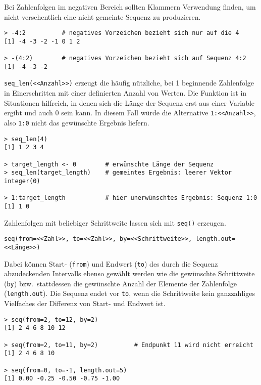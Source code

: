 Bei Zahlenfolgen im negativen Bereich sollten Klammern Verwendung finden, um nicht versehentlich eine nicht gemeinte Sequenz zu produzieren.
\begin{lstlisting}
> -4:2          # negatives Vorzeichen bezieht sich nur auf die 4
[1] -4 -3 -2 -1 0 1 2

> -(4:2)        # negatives Vorzeichen bezieht sich auf Sequenz 4:2
[1] -4 -3 -2
\end{lstlisting}

\lstinline!seq_len(<<Anzahl>>)! erzeugt die häufig nützliche, bei 1 beginnende Zahlenfolge in Einerschritten mit einer definierten Anzahl von Werten. Die Funktion ist in Situationen hilfreich, in denen sich die Länge der Sequenz erst aus einer Variable ergibt und auch 0 sein kann. In diesem Fall würde die Alternative \lstinline!1:<<Anzahl>>!, also \lstinline!1:0! nicht das gewünschte Ergebnis liefern.
\begin{lstlisting}
> seq_len(4)
[1] 1 2 3 4

> target_length <- 0        # erwünschte Länge der Sequenz
> seq_len(target_length)    # gemeintes Ergebnis: leerer Vektor
integer(0)

> 1:target_length           # hier unerwünschtes Ergebnis: Sequenz 1:0
[1] 1 0 
\end{lstlisting}

Zahlenfolgen mit beliebiger Schrittweite lassen sich mit \lstinline!seq()! erzeugen.
\begin{lstlisting}
seq(from=<<Zahl>>, to=<<Zahl>>, by=<<Schrittweite>>, length.out=<<Länge>>)
\end{lstlisting}

Dabei können Start- (\lstinline!from!) und Endwert (\lstinline!to!) des durch die Sequenz abzudeckenden Intervalls ebenso gewählt werden wie die gewünschte Schrittweite (\lstinline!by!) bzw.\ stattdessen die gewünschte Anzahl der Elemente der Zahlenfolge (\lstinline!length.out!). Die Sequenz endet vor \lstinline!to!, wenn die Schrittweite kein ganzzahliges Vielfaches der Differenz von Start- und Endwert ist.
\begin{lstlisting}
> seq(from=2, to=12, by=2)
[1] 2 4 6 8 10 12

> seq(from=2, to=11, by=2)          # Endpunkt 11 wird nicht erreicht
[1] 2 4 6 8 10

> seq(from=0, to=-1, length.out=5)
[1] 0.00 -0.25 -0.50 -0.75 -1.00
\end{lstlisting}

